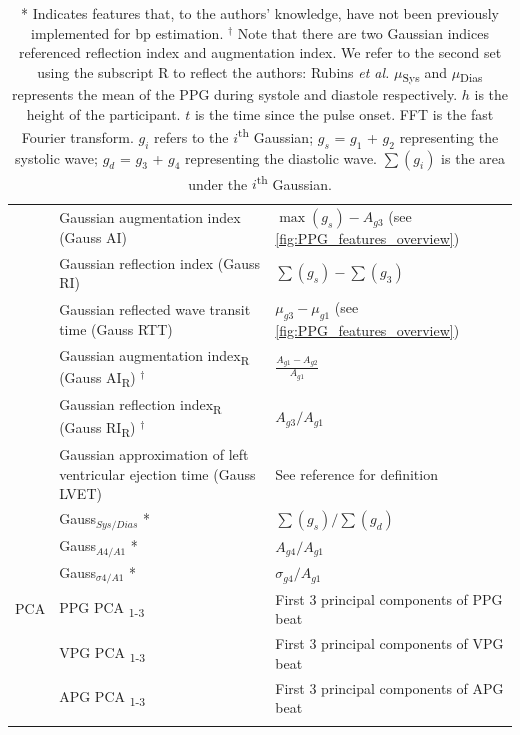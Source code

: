 \documentclass[fleqn,10pt]{wlscirep}
\begin{document}
{{\begin{longtable}{p{} p{} p{}}
			& Gaussian augmentation index (Gauss AI) \cite{Radha2019} & $\max(g_s) - A_{g3}$ (see \cref{fig:PPG_features_overview}) \\
			& Gaussian reflection index (Gauss RI) \cite{Radha2019} & $\sum(g_s) - \sum(g_3)$ \\
			& Gaussian reflected wave transit time (Gauss RTT) \cite{Rubins2008} & $\mu_{g3} - \mu_{g1}$ (see \cref{fig:PPG_features_overview}) \\
			& Gaussian augmentation index\textsubscript{R} (Gauss AI\textsubscript{R}) \cite{Rubins2008} $^{\dagger}$ & $\frac{A_{g1} - A_{g2}}{A_{g1}}$ \\
			& Gaussian reflection index\textsubscript{R} (Gauss RI\textsubscript{R}) \cite{Rubins2008} $^{\dagger}$ & $A_{g3}/A_{g1}$ \\
			& Gaussian approximation of left ventricular ejection time (Gauss LVET) \cite{Couceiro2012} & See reference for definition \\
			& Gauss$_{Sys/Dias}$ * &$\sum(g_s)/\sum(g_d)$ \\
			& Gauss$_{A4/A1}$ * & $A_{g4}/A_{g1}$ \\
			& Gauss$_{\sigma4/A1}$ * & $\sigma_{g4}/A_{g1}$ \\
			\hline
			\multirow{1}{*}{PCA} & PPG PCA \textsubscript{1-3} \cite{Xing2020}  & First 3 principal components of PPG beat \\
			& VPG PCA \textsubscript{1-3} \cite{Xing2020}  & First 3 principal components of VPG beat\\
			& APG PCA \textsubscript{1-3} \cite{Xing2020}  & First 3 principal components of APG beat\\
			\hline
			\hline
			\caption*{\small{* Indicates features that, to the authors' knowledge, have not been previously implemented for \ac{bp} estimation. $^{\dagger}$ Note that there are two Gaussian indices referenced reflection index and augmentation index. We refer to the second set using the subscript R to reflect the authors: Rubins \textit{et al.}} $\mu$\textsubscript{Sys} and $\mu$\textsubscript{Dias} represents the mean of the PPG during systole and diastole respectively. $h$ is the height of the participant. $t$ is the time since the pulse onset. FFT is the fast Fourier transform. $g_i$ refers to the $i$\textsuperscript{th} Gaussian; $g_s$ = $g_1$ + $g_2$ representing the systolic wave; $g_d$ = $g_3$ + $g_4$ representing the diastolic wave. $\sum(g_i)$ is the area under the $i$\textsuperscript{th} Gaussian. }
\end{longtable}
}
}
\end{document}
